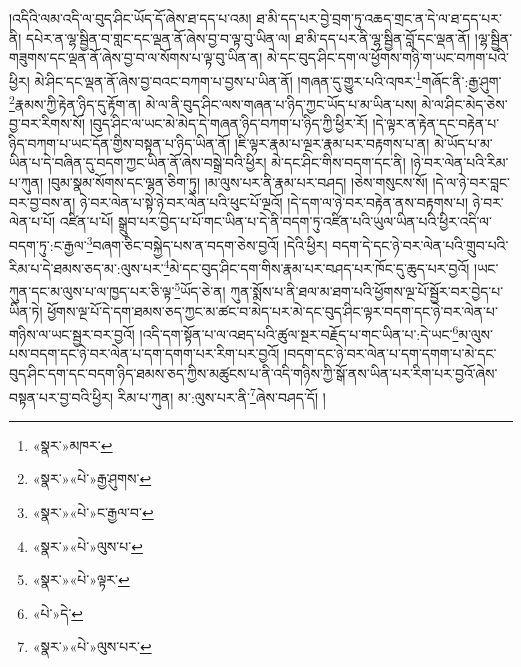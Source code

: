 །འདིའི་ལམ་འདི་ལ་བུད་ཤིང་ཡོད་དོ་ཞེས་ཐ་དད་པ་འམ། ཐ་མི་དད་པར་བྱེ་བྲག་ཏུ་འཆད་གྲང་ན་དེ་ལ་ཐ་དད་པར་ནི། དཔེར་ན་ལྷ་སྦྱིན་བ་གླང་དང་ལྡན་ནོ་ཞེས་བྱ་བ་ལྟ་བུ་ཡིན་ལ། ཐ་མི་དད་པར་ནི་ལྷ་སྦྱིན་བློ་དང་ལྡན་ནོ། །ལྷ་སྦྱིན་གཟུགས་དང་ལྡན་ནོ་ཞེས་བྱ་བ་ལ་སོགས་པ་ལྟ་བུ་ཡིན་ན། མེ་དང་བུད་ཤིང་དག་ལ་ཕྱོགས་གཉི་ག་ཡང་བཀག་པའི་ཕྱིར། མེ་ཤིང་དང་ལྡན་ནོ་ཞེས་བྱ་བའང་བཀག་པ་བྱས་པ་ཡིན་ནོ། །གཞན་དུ་གྱུར་པའི་འཁར་\footnote{«སྣར་»མཁར་}གཞོང་ནི་:རྒྱ་ཤུག་\footnote{«སྣར་»«པེ་»རྒྱ་ཤུགས་}རྣམས་ཀྱི་རྟེན་ཉིད་དུ་རྟོག་ན། མེ་ལ་ནི་བུད་ཤིང་ལས་གཞན་པ་ཉིད་ཀྱང་ཡོད་པ་མ་ཡིན་པས། མེ་ལ་ཤིང་མེད་ཅེས་བྱ་བར་རིགས་སོ། །བུད་ཤིང་ལ་ཡང་མེ་མེད་དེ་གཞན་ཉིད་བཀག་པ་ཉིད་ཀྱི་ཕྱིར་རོ། །དེ་ལྟར་ན་རྟེན་དང་བརྟེན་པ་ཉིད་བཀག་པ་ཡང་དོན་གྱིས་བསྟན་པ་ཉིད་ཡིན་ནོ། །ཇི་ལྟར་རྣམ་པ་ལྔར་རྣམ་པར་བརྟགས་པ་ན། མེ་ཡོད་པ་མ་ཡིན་པ་དེ་བཞིན་དུ་བདག་ཀྱང་ཡིན་ནོ་ཞེས་བསྒྲེ་བའི་ཕྱིར། མེ་དང་ཤིང་གིས་བདག་དང་ནི། །ཉེ་བར་ལེན་པའི་རིམ་པ་ཀུན། །བུམ་སྣམ་སོགས་དང་ལྷན་ཅིག་ཏུ། །མ་ལུས་པར་ནི་རྣམ་པར་བཤད། །ཅེས་གསུངས་སོ། །དེ་ལ་ཉེ་བར་བླང་བར་བྱ་བས་ན། ཉེ་བར་ལེན་པ་སྟེ་ཉེ་བར་ལེན་པའི་ཕུང་པོ་ལྔའོ། །དེ་དག་ལ་ཉེ་བར་བརྟེན་ནས་བརྟགས་པ། ཉེ་བར་ལེན་པ་པོ། འཛིན་པ་པོ། སྒྲུབ་པར་བྱེད་པ་པོ་གང་ཡིན་པ་དེ་ནི་བདག་ཏུ་འཛིན་པའི་ཡུལ་ཡིན་པའི་ཕྱིར་འདི་ལ་བདག་ཏུ་:ང་རྒྱལ་\footnote{«སྣར་»«པེ་»ང་རྒྱལ་བ་}བཞག་ཅིང་བསྐྱེད་པས་ན་བདག་ཅེས་བྱའོ། །དེའི་ཕྱིར། བདག་དེ་དང་ཉེ་བར་ལེན་པའི་གྲུབ་པའི་རིམ་པ་དེ་ཐམས་ཅད་མ་:ལུས་པར་\footnote{«སྣར་»«པེ་»ལུས་པ་}མེ་དང་བུད་ཤིང་དག་གིས་རྣམ་པར་བཤད་པར་ཁོང་དུ་ཆུད་པར་བྱའོ། །ཡང་ཀུན་དང་མ་ལུས་པ་ལ་ཁྱད་པར་ཅི་ལྟ་\footnote{«སྣར་»«པེ་»ལྟར་}ཡོད་ཅེ་ན། ཀུན་སྨོས་པ་ནི་ཐལ་མ་ཐག་པའི་ཕྱོགས་ལྔ་པོ་སྦྱོར་བར་བྱེད་པ་ཡིན་ཏེ། ཕྱོགས་ལྔ་པོ་དེ་དག་ཐམས་ཅད་ཀྱང་མ་ཚང་བ་མེད་པར་མེ་དང་བུད་ཤིང་ལྟར་བདག་དང་ཉེ་བར་ལེན་པ་གཉིས་ལ་ཡང་སྦྱར་བར་བྱའོ། །འདི་དག་སྟོན་པ་ལ་འཐད་པའི་ཚུལ་སྔར་བརྗོད་པ་གང་ཡིན་པ་:དེ་ཡང་\footnote{«པེ་»དེ་}མ་ལུས་པས་བདག་དང་ཉེ་བར་ལེན་པ་དག་དགག་པར་རིག་པར་བྱའོ། །བདག་དང་ཉེ་བར་ལེན་པ་དག་དགག་པ་མེ་དང་བུད་ཤིང་དག་དང་བདག་ཉིད་ཐམས་ཅད་ཀྱིས་མཚུངས་པ་ནི་འདི་གཉིས་ཀྱི་སྒོ་ནས་ཡིན་པར་རིག་པར་བྱའོ་ཞེས་བསྟན་པར་བྱ་བའི་ཕྱིར། རིམ་པ་ཀུན། མ་:ལུས་པར་ནི་\footnote{«སྣར་»«པེ་»ལུས་པར་}ཞེས་བཤད་དོ། །
